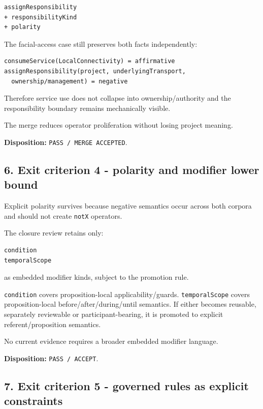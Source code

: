 \documentclass[11pt,a4paper]{article}
\begin{document}
\begin{verbatim}
assignResponsibility
+ responsibilityKind
+ polarity
\end{verbatim}

The facial-access case still preserves both facts independently:

\begin{verbatim}
consumeService(LocalConnectivity) = affirmative
assignResponsibility(project, underlyingTransport,
  ownership/management) = negative
\end{verbatim}

Therefore service use does not collapse into ownership/authority and the responsibility boundary remains mechanically visible.

The merge reduces operator proliferation without losing project meaning.

\textbf{Disposition:} \texttt{PASS\ /\ MERGE\ ACCEPTED}.

\subsection{6. Exit criterion 4 - polarity and modifier lower bound}\label{exit-criterion-4---polarity-and-modifier-lower-bound}

Explicit polarity survives because negative semantics occur across both corpora and should not create \texttt{notX} operators.

The closure review retains only:

\begin{verbatim}
condition
temporalScope
\end{verbatim}

as embedded modifier kinds, subject to the promotion rule.

\texttt{condition} covers proposition-local applicability/guards. \texttt{temporalScope} covers proposition-local before/after/during/until semantics. If either becomes reusable, separately reviewable or participant-bearing, it is promoted to explicit referent/proposition semantics.

No current evidence requires a broader embedded modifier language.

\textbf{Disposition:} \texttt{PASS\ /\ ACCEPT}.

\subsection{7. Exit criterion 5 - governed rules as explicit constraints}\label{exit-criterion-5---governed-rules-as-explicit-constraints}
\end{document}
